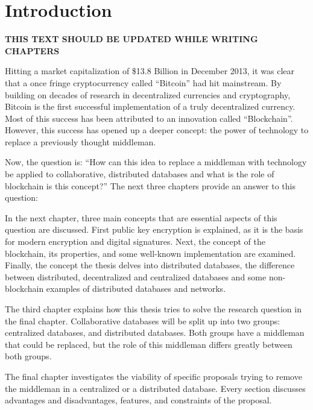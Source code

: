 \chapter{Introduction}

\textbf{THIS TEXT SHOULD BE UPDATED WHILE WRITING CHAPTERS}


Hitting a market capitalization of \$13.8 Billion in December 2013, it was clear that a once fringe cryptocurrency called ``Bitcoin'' had hit mainstream. By building on decades of research in decentralized currencies and cryptography, Bitcoin is the first successful implementation of a truly decentralized currency. Most of this success has been attributed to an innovation called ``Blockchain''. However, this success has opened up a deeper concept: the power of technology to replace a previously thought middleman.


Now, the question is: ``How can this idea to replace a middleman with technology be applied to collaborative, distributed databases and what is the role of blockchain is this concept?'' The next three chapters provide an answer to this question:


In the next chapter, three main concepts that are essential aspects of this question are discussed. First public key encryption is explained, as it is the basis for modern encryption and digital signatures. Next, the concept of the blockchain, its properties, and some well-known implementation are examined. Finally, the concept the thesis delves into distributed databases, the difference between distributed, decentralized and centralized databases and some non-blockchain examples of distributed databases and networks.

The third chapter explains how this thesis tries to solve the research question in the final chapter. Collaborative databases will be split up into two groups: centralized databases, and distributed databases. Both groups have a middleman that could be replaced, but the role of this middleman differs greatly between both groups. 

The final chapter investigates the viability of specific proposals trying to remove the middleman in a centralized or a distributed database. Every section discusses advantages and disadvantages, features, and constraints of the proposal.
